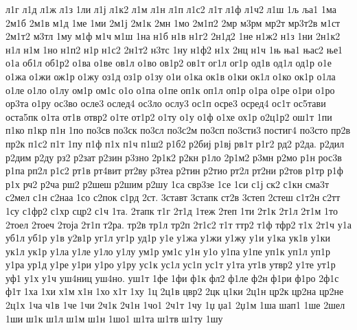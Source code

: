 {л1г
л1д
л1ж
л1з
1ли
л1ј
л1к2
л1м
л1н
л1п
л1с2
л1т
л1ф
л1ч2
л1ш
1љ
ља1
1ма
2м1б
2м1в
м1д
1ме
1ми
2м1ј
2м1к
2мн
1мо
2м1п2
2мр
м3рм
мр2т
мр3т2в
м1ст
2м1т2
м3тл
1му
м1ф
м1ч
м1ш
1на
н1б
н1в
н1г2
2н1д2
1не
н1ж2
н1з
1ни
2н1к2
н1л
н1м
1но
н1п2
н1р
н1с2
2н1т2
н3тс
1ну
н1ф2
н1х
2нц
н1ч
1њ
ња1
њас2
ње1
о1а
об1л
об1р2
о1ва
о1ве
ов1л
о1во
ов1р2
ов1т
ог1л
ог1р
од1в
од1л
од1р
о1е
о1жа
о1жи
ож1р
о1жу
оз1д
оз1р
о1зу
о1и
о1ка
ок1в
о1ки
ок1л
о1ко
ок1р
о1ла
о1ле
о1ло
о1лу
ом1р
ом1с
о1о
о1па
о1пе
оп1к
оп1л
оп1р
о1ра
о1ре
о1ри
о1ро
ор3та
о1ру
ос3во
осле3
ослед4
ос3ло
ослу3
ос1п
осре3
осред4
ос1т
ос5тави
оста5пк
о1та
от1в
отвр2
о1те
от1р2
о1ту
о1у
о1ф
о1хе
ох1р
о2ц1р2
ош1т
1пи
п1ко
п1кр
п1н
1по
по3св
по3ск
по3сл
по3с2м
по3сп
по3сти3
постиг4
по3сто
пр2в
пр2к
п1с2
п1т
1пу
п1ф
п1х
п1ч
п1ш2
р1б2
р2биј
р1вј
рв1т
р1г2
рд2
р2да.
р2дил
р2дим
р2ду
рз2
р2зат
р2зин
р3зно
2р1к2
р2кн
р1ло
2р1м2
р3мн
р2мо
р1н
рос3в
р1па
рп2л
р1с2
рт1в
рт4вит
рт2ву
р3теа
р2тин
р2тио
рт2л
рт2ни
р2тов
р1тр
р1ф
р1х
рч2
р2ча
рш2
р2шеш
р2шим
р2шу
1са
свр3зе
1се
1си
с1ј
ск2
с1кн
сма3т
с2мел
с1н
с2наа
1со
с2пок
с1рд
2ст.
3ставт
3стапк
ст2в
3степ
2стеш
с1т2н
с2тт
1су
с1фр2
с1хр
сцр2
с1ч
1та.
2тапк
т1г
2т1д
1теж
2теп
1ти
2т1к
2т1л
2т1м
1то
2тоел
2тоеч
2тоја
2т1п
т2ра.
тр2в
тр1л
тр2п
2т1с2
т1т
ттр2
т1ф
тфр2
т1х
2т1ч
у1а
уб1л
уб1р
у1в
у2в1р
уг1л
уг1р
уд1р
у1е
у1жа
у1жи
у1жу
у1и
у1ка
ук1в
у1ки
ук1л
ук1р
у1ла
у1ле
у1ло
у1лу
ум1р
ум1с
у1н
у1о
у1па
у1пе
уп1к
уп1л
уп1р
у1ра
ур1д
у1ре
у1ри
у1ро
у1ру
ус1к
ус1л
ус1п
ус1т
у1та
ут1в
утвр2
у1те
ут1р
уф1
у1х
у1ч
уш4ниц
уш4но.
уш1т
1фе
1фи
ф1к
фл2
ф1ле
ф2н
ф1ри
ф1ро
2ф1с
ф1т
1ха
1хи
х1м
х1н
1хо
х1т
1ху
1ц
2ц1в
цвр2
2цк
ц1ки
2ц1н
цр2к
цр2на
цр2не
2ц1х
1ча
ч1в
1че
1чи
2ч1к
2ч1н
1чо1
2ч1т
1чу
1џ
џа1
2џ1м
1ша
шап1
1ше
2шел
1ши
ш1к
ш1л
ш1м
ш1н
1шо1
ш1та
ш1тв
ш1ту
1шу
}
